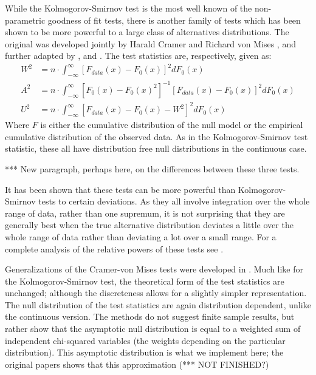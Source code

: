 \documentclass[article]{jss}
\begin{document}
While the Kolmogorov-Smirnov test is the most well known of the non-parametric goodness of fit tests, there is another family of 
tests which has been shown to be more powerful to a large class of alternatives distributions. The original was developed jointly by
Harald Cramer and Richard von Mises \citep{cramer1928, vonmises1928}, and further adapted by \cite{anderson1952}, and 
\cite{Watson1961}. The test statistics are, respectively, given as:
\begin{align*}
W^2 &= n \cdot \int_{-\infty}^{\infty} \left[ F_{data}(x)- F_{0}(x) \right]^2 dF_0(x) \\
A^2 &= n \cdot \int_{-\infty}^{\infty} \left[F_0(x) -F_0(x)^2 \right]^{-1} \left[ F_{data}(x)- F_{0}(x) \right]^2 dF_0(x) \\
U^2 &= n \cdot \int_{-\infty}^{\infty} \left[ F_{data}(x)- F_{0}(x) - W^2 \right]^2 dF_0(x)
\end{align*}
Where $F$ is either the cumulative distribution of the null model or the empirical cumulative distribution of the observed data.
As in the Kolmogorov-Smirnov test statistic, these all have distribution free null distributions in the continuous case. 

*** New paragraph, perhaps here, on the differences between these three tests.

It has been shown that these tests can be more powerful than Kolmogorov-Smirnov tests to certain deviations. As they all involve
integration over the whole range of data, rather than one supremum, it is not surprising that they are generally best when the
true alternative distribution deviates a little over the whole range of data rather than deviating a lot over a small range. For
a complete analysis of the relative powers of these tests see \cite{stephens1974}.

Generalizations of the Cramer-von Mises tests were developed in \cite{choulakian1994}. Much like for the Kolmogorov-Smirnov test,
the theoretical form of the test statistics are unchanged; although the discreteness allows for a slightly simpler representation.
The null distribution of the test statistics are again distribution dependent, unlike the continuous version. The methods do not
suggest finite sample results, but rather show that the asymptotic null distribution is equal to a weighted sum of independent
chi-squared variables (the weights depending on the particular distribution). This asymptotic distribution is what we implement here;
the original papers shows that this approximation (*** NOT FINISHED?)
\end{document}
